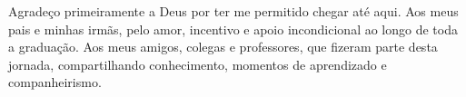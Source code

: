\begin{agradecimentos}
Agradeço primeiramente a Deus por ter me permitido chegar até aqui. Aos meus pais e minhas irmãs, pelo amor, incentivo e apoio incondicional ao longo de toda a graduação. Aos meus amigos, colegas e professores, que fizeram parte desta jornada, compartilhando conhecimento, momentos de aprendizado e companheirismo.
\end{agradecimentos}

